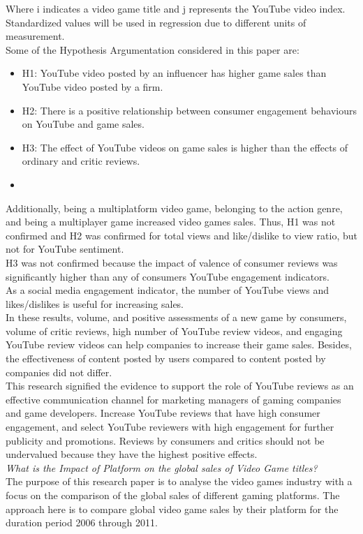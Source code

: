 \documentclass[conference]{IEEEtran}
\begin{document}
Where i indicates a video game title and j represents the YouTube video index. Standardized values will be used in regression due to different units of measurement.\\
Some of the Hypothesis Argumentation considered in this paper are:\\
\begin{itemize}
    \item H1: YouTube video posted by an influencer has higher game sales than YouTube video posted by a firm.
    \item H2: There is a positive relationship between consumer engagement behaviours on YouTube and game sales.
    \item H3: The effect of YouTube videos on game sales is higher than the effects of ordinary and critic reviews.
    \item
\end{itemize}
Additionally, being a multiplatform video game, belonging to the action genre, and being a multiplayer game increased video games sales. Thus, H1 was not confirmed and H2 was confirmed for total views and like/dislike to view ratio, but not for YouTube sentiment.\\
H3 was not confirmed because the impact of valence of consumer reviews was significantly higher than any of consumers YouTube engagement indicators.\\
As a social media engagement indicator, the number of YouTube views and likes/dislikes is useful for increasing sales.\\
In these results, volume, and positive assessments of a new game by consumers, volume of critic reviews, high number of YouTube review videos, and engaging YouTube review videos can help companies to increase their game sales. Besides, the effectiveness of content posted by users compared to content posted by companies did not differ.\\
This research signified the evidence to support the role of YouTube reviews as an effective communication channel for marketing managers of gaming companies and game developers. Increase YouTube reviews that have high consumer engagement, and select YouTube reviewers with high engagement for further publicity and promotions. Reviews by consumers and critics should not be undervalued because they have the highest positive effects.\\
\hfill \break
\textit{What is the Impact of Platform on the global sales of Video Game titles?}\\
The purpose of this research paper is to analyse the video games industry with a focus on the comparison of the global sales of different gaming platforms. The approach here is to compare global video game sales by their platform for the duration period 2006 through 2011.\\
\end{document}
